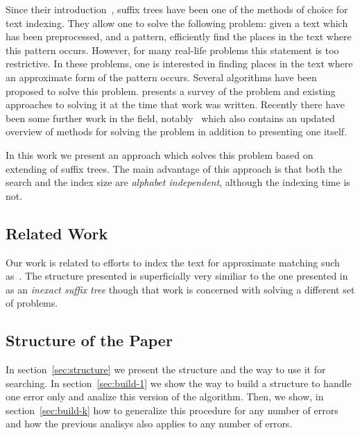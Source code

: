 Since their introduction~\cite{weiner}, suffix trees have been one of the methods of choice for text indexing. They allow one to solve the following problem: given a text which has been preprocessed, and a pattern, efficiently find the places in the text where this pattern occurs.  However, for many real-life problems this statement is too restrictive. In these problems, one is interested in finding places in the text where an approximate form of the pattern occurs. Several algorithms have been proposed to solve this problem. \cite{navarro:guided} presents a survey of the problem and existing approaches to solving it at the time that work was written. Recently there have been some further work in the field, notably~\cite{maass:text} which also contains an updated overview of methods for solving the problem in addition to presenting one itself.

In this work we present an approach which solves this problem based on extending of suffix trees. The main advantage of this approach is that both the search and the index size are \emph{alphabet independent}, although the indexing time is not.

\subsection{Related Work}

Our work is related to efforts to index the text for approximate matching such as~\cite{maass:text,mosche}. The structure presented is superficially very similiar to the one presented in~\cite{inexact} as an \textit{inexact suffix tree} though that work is concerned with solving a different set of problems.

\subsection{Structure of the Paper}

In section~\ref{sec:structure} we present the structure and the way to use it for searching. In section~\ref{sec:build-1} we show the way to build a structure to handle one error only and analize this version of the algorithm. Then, we show, in section~\ref{sec:build-k} how to generalize this procedure for any number of errors and how the previous analisys also applies to any number of errors.

